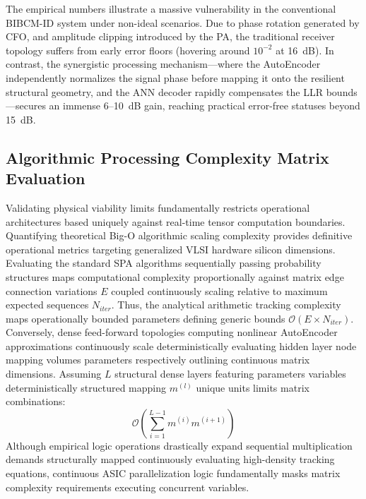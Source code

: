 \documentclass[a4paper,14pt]{extreport}
\begin{document}
The empirical numbers illustrate a massive vulnerability in the conventional BIBCM-ID system under non-ideal scenarios. Due to phase rotation generated by CFO, and amplitude clipping introduced by the PA, the traditional receiver topology suffers from early error floors (hovering around $10^{-2}$ at 16~dB). In contrast, the synergistic processing mechanism---where the AutoEncoder independently normalizes the signal phase before mapping it onto the resilient structural geometry, and the ANN decoder rapidly compensates the LLR bounds---secures an immense 6--10~dB gain, reaching practical error-free statuses beyond 15~dB.

\subsection{Algorithmic Processing Complexity Matrix Evaluation}
Validating physical viability limits fundamentally restricts operational architectures based uniquely against real-time tensor computation boundaries. Quantifying theoretical Big-O algorithmic scaling complexity provides definitive operational metrics targeting generalized VLSI hardware silicon dimensions. Evaluating the standard SPA algorithms sequentially passing probability structures maps computational complexity proportionally against matrix edge connection variations $E$ coupled continuously scaling relative to maximum expected sequences $N_{iter}$. Thus, the analytical arithmetic tracking complexity maps operationally bounded parameters defining generic bounds $\mathcal{O}(E \times N_{iter})$. Conversely, dense feed-forward topologies computing nonlinear AutoEncoder approximations continuously scale deterministically evaluating hidden layer node mapping volumes parameters respectively outlining continuous matrix dimensions. Assuming $L$ structural dense layers featuring parameters variables deterministically structured mapping $m^{(l)}$ unique units limits matrix combinations:
\begin{equation}
    \mathcal{O}\left( \sum_{i=1}^{L-1} m^{(i)} m^{(i+1)} \right)
\end{equation}
Although empirical logic operations drastically expand sequential multiplication demands structurally mapped continuously evaluating high-density tracking equations, continuous ASIC parallelization logic fundamentally masks matrix complexity requirements executing concurrent variables. 
\end{document}
